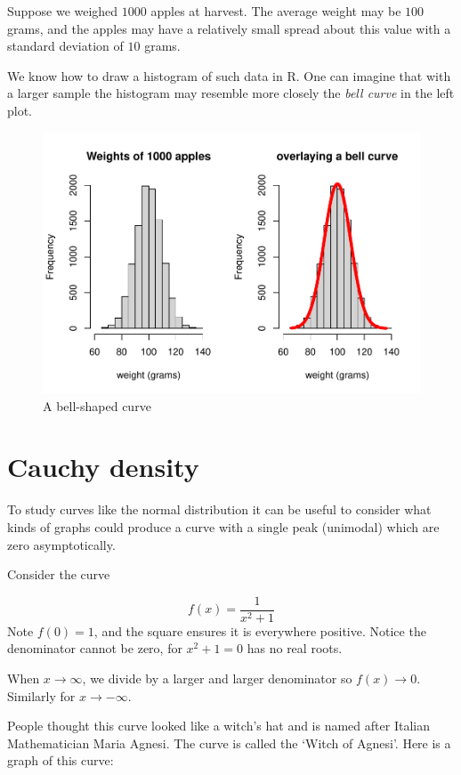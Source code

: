 \documentclass[
]{book}
\theoremstyle{definition}
\theoremstyle{definition}
\theoremstyle{definition}
\theoremstyle{definition}
\theoremstyle{remark}
\begin{document}
Suppose we weighed \(1000\) apples at harvest. The average weight may be \(100\) grams, and the apples may have a relatively small spread about this value with a standard deviation of \(10\) grams.

We know how to draw a histogram of such data in R. One can imagine that with a larger sample the histogram may resemble more closely the \emph{bell curve} in the left plot.

\begin{figure}
\centering
\includegraphics{6G4Z3008-notes_files/figure-latex/rnormhist-1.pdf}
\caption{\label{fig:rnormhist}A bell-shaped curve}
\end{figure}

\hypertarget{cauchy-density}{%
\section{Cauchy density}\label{cauchy-density}}

To study curves like the normal distribution it can be useful to consider what kinds of graphs could produce a curve with a single peak (unimodal) which are zero asymptotically.

Consider the curve

\[f(x) = \frac{1}{x^2+1}\]
Note \(f(0)=1\), and the square ensures it is everywhere positive. Notice the denominator cannot be zero, for \(x^2+1=0\) has no real roots.

When \(x\to \infty\), we divide by a larger and larger denominator so \(f(x)\to 0\). Similarly for \(x\to -\infty\).

People thought this curve looked like a witch's hat and is named after Italian Mathematician Maria Agnesi. The curve is called the `Witch of Agnesi'. Here is a graph of this curve:
\end{document}
